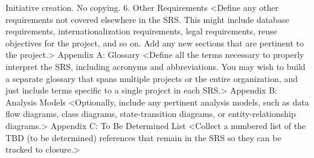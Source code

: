 Initiative creation. No copying.
6.	Other Requirements
<Define any other requirements not covered elsewhere in the SRS. This might include database requirements, internationalization requirements, legal requirements, reuse objectives for the project, and so on. Add any new sections that are pertinent to the project.>
Appendix A: Glossary
<Define all the terms necessary to properly interpret the SRS, including acronyms and abbreviations. You may wish to build a separate glossary that spans multiple projects or the entire organization, and just include terms specific to a single project in each SRS.>
Appendix B: Analysis Models
<Optionally, include any pertinent analysis models, such as data flow diagrams, class diagrams, state-transition diagrams, or entity-relationship diagrams.>
Appendix C: To Be Determined List
<Collect a numbered list of the TBD (to be determined) references that remain in the SRS so they can be tracked to closure.>


